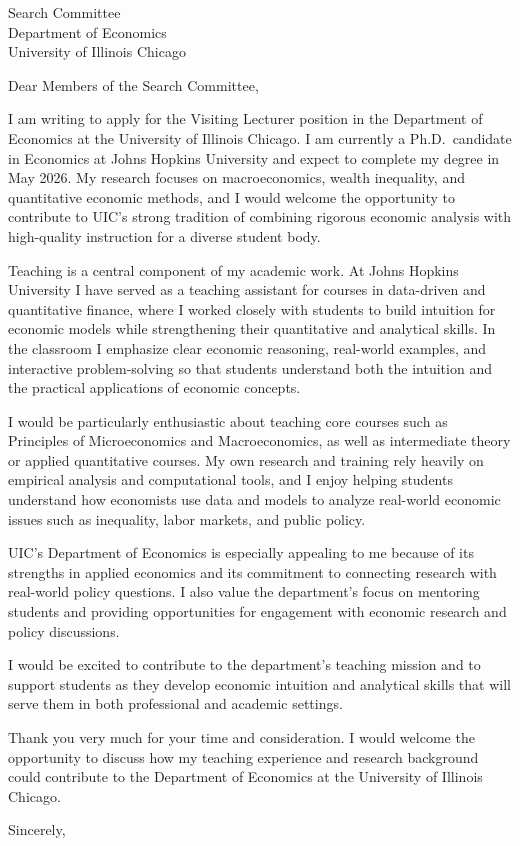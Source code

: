 \documentclass[11pt]{letter}
\begin{document}
\begin{letter}{Search Committee \\
Department of Economics \\
University of Illinois Chicago}

\opening{Dear Members of the Search Committee,}

I am writing to apply for the Visiting Lecturer position in the Department of Economics at the University of Illinois Chicago. I am currently a Ph.D.\ candidate in Economics at Johns Hopkins University and expect to complete my degree in May 2026. My research focuses on macroeconomics, wealth inequality, and quantitative economic methods, and I would welcome the opportunity to contribute to UIC’s strong tradition of combining rigorous economic analysis with high-quality instruction for a diverse student body.

Teaching is a central component of my academic work. At Johns Hopkins University I have served as a teaching assistant for courses in data-driven and quantitative finance, where I worked closely with students to build intuition for economic models while strengthening their quantitative and analytical skills. In the classroom I emphasize clear economic reasoning, real-world examples, and interactive problem-solving so that students understand both the intuition and the practical applications of economic concepts.

I would be particularly enthusiastic about teaching core courses such as Principles of Microeconomics and Macroeconomics, as well as intermediate theory or applied quantitative courses. My own research and training rely heavily on empirical analysis and computational tools, and I enjoy helping students understand how economists use data and models to analyze real-world economic issues such as inequality, labor markets, and public policy.

UIC’s Department of Economics is especially appealing to me because of its strengths in applied economics and its commitment to connecting research with real-world policy questions. I also value the department’s focus on mentoring students and providing opportunities for engagement with economic research and policy discussions.

I would be excited to contribute to the department’s teaching mission and to support students as they develop economic intuition and analytical skills that will serve them in both professional and academic settings.

Thank you very much for your time and consideration. I would welcome the opportunity to discuss how my teaching experience and research background could contribute to the Department of Economics at the University of Illinois Chicago.

\closing{Sincerely,}

\end{letter}
\end{document}
